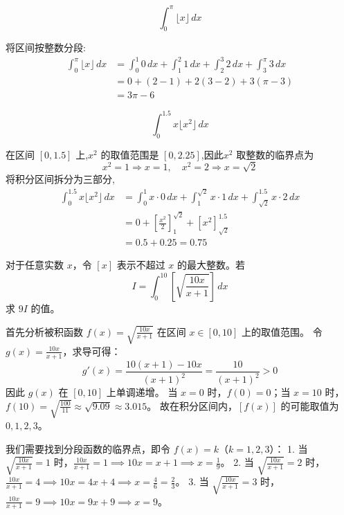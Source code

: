 \begin{questions}
    \question
    \[
    \int_{0}^{\pi} \lfloor x \rfloor \,dx
    \]
    \begin{solution}
        将区间按整数分段:
        \begin{align*}
        \int_{0}^{\pi} \lfloor x \rfloor \,dx &= \int_{0}^{1} 0 \,dx + \int_{1}^{2} 1 \,dx + \int_{2}^{3} 2 \,dx + \int_{3}^{\pi} 3 \,dx \\
        &= 0 + (2-1) + 2(3-2) + 3(\pi-3) \\
        &= 3\pi - 6
        \end{align*}
    \end{solution}

    \question 
    \[
    \int_{0}^{1.5} x \lfloor x^2 \rfloor \, dx
    \]
    \begin{solution}
        在区间 $[0, 1.5]$ 上,$x^2$ 的取值范围是 $[0, 2.25]$,因此$x^2$ 取整数的临界点为
        \[
        x^2 = 1 \Rightarrow x = 1,\quad x^2 = 2 \Rightarrow x = \sqrt{2}
        \]
        将积分区间拆分为三部分,
        \begin{align*}
        \int_{0}^{1.5} x \lfloor x^2 \rfloor \, dx &= \int_{0}^{1} x \cdot 0 \, dx + \int_{1}^{\sqrt{2}} x \cdot 1 \, dx + \int_{\sqrt{2}}^{1.5} x \cdot 2 \, dx \\
        &= 0 + \left[ \frac{x^2}{2} \right]_{1}^{\sqrt{2}} + \left[ x^2 \right]_{\sqrt{2}}^{1.5} \\
        &= 0.5 + 0.25 = 0.75
        \end{align*}
    \end{solution}

    \question
对于任意实数 $x$，令 $[x]$ 表示不超过 $x$ 的最大整数。若
\[ I = \int_{0}^{10} \left[ \sqrt{\frac{10x}{x+1}} \right] \,dx \]
求 $9I$ 的值。

\begin{solution}
首先分析被积函数 $f(x) = \sqrt{\frac{10x}{x+1}}$ 在区间 $x \in [0, 10]$ 上的取值范围。
令 $g(x) = \frac{10x}{x+1}$，求导可得：
\[ g'(x) = \frac{10(x+1) - 10x}{(x+1)^2} = \frac{10}{(x+1)^2} > 0 \]
因此 $g(x)$ 在 $[0, 10]$ 上单调递增。
当 $x=0$ 时，$f(0)=0$；当 $x=10$ 时，$f(10)=\sqrt{\frac{100}{11}} \approx \sqrt{9.09} \approx 3.015$。
故在积分区间内，$[f(x)]$ 的可能取值为 $0, 1, 2, 3$。

我们需要找到分段函数的临界点，即令 $f(x) = k$（$k=1, 2, 3$）：
1. 当 $\sqrt{\frac{10x}{x+1}} = 1$ 时，$\frac{10x}{x+1} = 1 \implies 10x = x + 1 \implies x = \frac{1}{9}$。
2. 当 $\sqrt{\frac{10x}{x+1}} = 2$ 时，$\frac{10x}{x+1} = 4 \implies 10x = 4x + 4 \implies x = \frac{4}{6} = \frac{2}{3}$。
3. 当 $\sqrt{\frac{10x}{x+1}} = 3$ 时，$\frac{10x}{x+1} = 9 \implies 10x = 9x + 9 \implies x = 9$。


\end{solution}
\end{questions}
